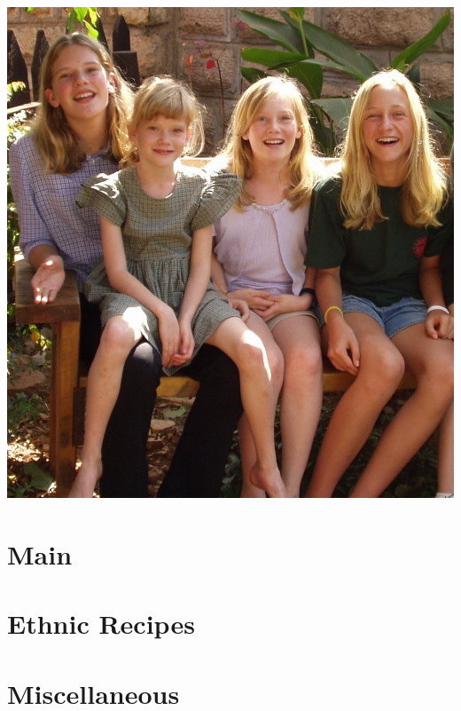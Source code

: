 \documentclass[10pt]{memoir} %
\begin{document}
\newpage
\vspace{1in}
\centerline{\includegraphics[width=0.75\linewidth]{Girls.jpg}}


\part{Main}

















\part{Ethnic Recipes}






%

\part{Miscellaneous}


\printindex
\end{document}
